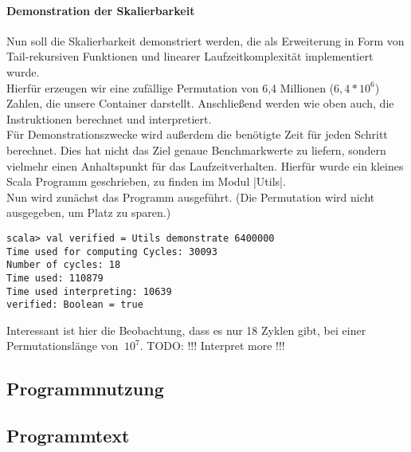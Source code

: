 \paragraph{Demonstration der Skalierbarkeit}
Nun soll die Skalierbarkeit demonstriert werden,
die als Erweiterung in Form von Tail-rekursiven Funktionen und linearer Laufzeitkomplexität implementiert wurde.\\
Hierfür erzeugen wir eine zufällige Permutation von 6,4 Millionen ($6,4 * 10^6$) Zahlen, die unsere Container darstellt.
Anschließend werden wie oben auch, die Instruktionen berechnet und interpretiert. \\
Für Demonstrationszwecke wird außerdem die benötigte Zeit für jeden Schritt berechnet.
Dies hat nicht das Ziel genaue Benchmarkwerte zu liefern, sondern vielmehr einen Anhaltspunkt für das Laufzeitverhalten.
Hierfür wurde ein kleines Scala Programm geschrieben, zu finden im Modul |Utils|.
\\
Nun wird zunächst das Programm ausgeführt. (Die Permutation wird nicht ausgegeben, um Platz zu sparen.)
\begin{lstlisting}
scala> val verified = Utils demonstrate 6400000
Time used for computing Cycles: 30093
Number of cycles: 18
Time used: 110879
Time used interpreting: 10639
verified: Boolean = true
\end{lstlisting}
Interessant ist hier die Beobachtung, dass es nur 18 Zyklen gibt, bei einer Permutationslänge von $~10^7$.
TODO: !!! Interpret more !!!

\subsection{Programmnutzung}
\subsection{Programmtext}